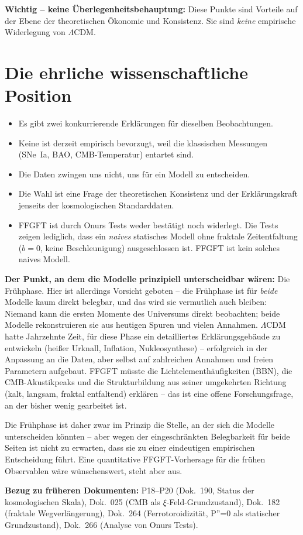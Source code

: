 \textbf{Wichtig -- keine Überlegenheitsbehauptung:} Diese Punkte sind
Vorteile auf der Ebene der theoretischen Ökonomie und Konsistenz. Sie sind
\emph{keine} empirische Widerlegung von $\Lambda$CDM.

\section{Die ehrliche wissenschaftliche Position}

\begin{itemize}
  \item Es gibt zwei konkurrierende Erklärungen für dieselben Beobachtungen.
  \item Keine ist derzeit empirisch bevorzugt, weil die klassischen
        Messungen (SNe~Ia, BAO, CMB-Temperatur) entartet sind.
  \item Die Daten zwingen uns nicht, uns für ein Modell zu entscheiden.
  \item Die Wahl ist eine Frage der theoretischen Konsistenz und der
        Erklärungskraft jenseits der kosmologischen Standarddaten.
  \item FFGFT ist durch Onurs Tests weder bestätigt noch widerlegt. Die
        Tests zeigen lediglich, dass ein \emph{naives} statisches Modell
        ohne fraktale Zeitentfaltung ($b = 0$, keine Beschleunigung)
        ausgeschlossen ist. FFGFT ist kein solches naives Modell.
\end{itemize}

\textbf{Der Punkt, an dem die Modelle prinzipiell unterscheidbar wären:}
Die Frühphase. Hier ist allerdings Vorsicht geboten -- die Frühphase ist
für \emph{beide} Modelle kaum direkt belegbar, und das wird sie vermutlich
auch bleiben: Niemand kann die ersten Momente des Universums direkt
beobachten; beide Modelle rekonstruieren sie aus heutigen Spuren und vielen
Annahmen. $\Lambda$CDM hatte Jahrzehnte Zeit, für diese Phase ein
detailliertes Erklärungsgebäude zu entwickeln (heißer Urknall, Inflation,
Nukleosynthese) -- erfolgreich in der Anpassung an die Daten, aber selbst
auf zahlreichen Annahmen und freien Parametern aufgebaut. FFGFT müsste die
Lichtelementhäufigkeiten (BBN), die CMB-Akustikpeaks und die Strukturbildung
aus seiner umgekehrten Richtung (kalt, langsam, fraktal entfaltend) erklären
-- das ist eine offene Forschungsfrage, an der bisher wenig gearbeitet ist.

Die Frühphase ist daher zwar im Prinzip die Stelle, an der sich die Modelle
unterscheiden könnten -- aber wegen der eingeschränkten Belegbarkeit für
beide Seiten ist nicht zu erwarten, dass sie zu einer eindeutigen
empirischen Entscheidung führt. Eine quantitative FFGFT-Vorhersage für die
frühen Observablen wäre wünschenswert, steht aber aus.

\noindent\textbf{Bezug zu früheren Dokumenten:} P18--P20 (Dok.~190, Status
der kosmologischen Skala), Dok.~025 (CMB als $\xi$-Feld-Grundzustand),
Dok.~182 (fraktale Wegverlängerung), Dok.~264 (Ferrotoroidizität, P''=0
als statischer Grundzustand), Dok.~266 (Analyse von Onurs Tests).
